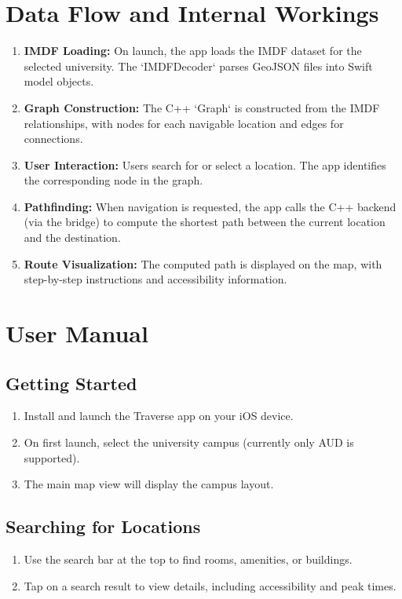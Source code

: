 \documentclass{article}
\begin{document}
\section{Data Flow and Internal Workings}
\begin{enumerate}
    \item \textbf{IMDF Loading:} On launch, the app loads the IMDF dataset for the selected university. The `IMDFDecoder` parses GeoJSON files into Swift model objects.
    \item \textbf{Graph Construction:} The C++ `Graph` is constructed from the IMDF relationships, with nodes for each navigable location and edges for connections.
    \item \textbf{User Interaction:} Users search for or select a location. The app identifies the corresponding node in the graph.
    \item \textbf{Pathfinding:} When navigation is requested, the app calls the C++ backend (via the bridge) to compute the shortest path between the current location and the destination.
    \item \textbf{Route Visualization:} The computed path is displayed on the map, with step-by-step instructions and accessibility information.
\end{enumerate}

\section{User Manual}
\subsection{Getting Started}
\begin{enumerate}
    \item Install and launch the Traverse app on your iOS device.
    \item On first launch, select the university campus (currently only AUD is supported).
    \item The main map view will display the campus layout.
\end{enumerate}

\subsection{Searching for Locations}
\begin{enumerate}
    \item Use the search bar at the top to find rooms, amenities, or buildings.
    \item Tap on a search result to view details, including accessibility and peak times.
\end{enumerate}
\end{document}
